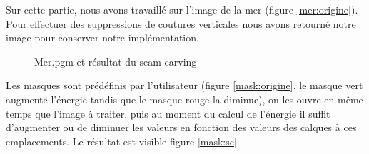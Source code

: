 \documentclass{article}
\begin{document}
Sur cette partie, nous avons travaillé sur l'image de la mer (figure \ref{mer:origine}). Pour effectuer des suppressions de coutures verticales nous avons retourné notre image pour conserver notre implémentation. 

\begin{figure}[!ht]%
  \centering
  \hspace{0.030\textwidth}
  \caption{Mer.pgm et résultat du seam carving}
  \label{mer:init}
\end{figure}

Les masques sont prédéfinis par l'utilisateur (figure \ref{mask:origine}, le masque vert augmente l'énergie tandis que le masque rouge la diminue), on les ouvre en même temps que l'image à
traiter, puis au moment du calcul de l'énergie il suffit d'augmenter ou de diminuer les valeurs
en fonction des valeurs des calques à ces emplacements. Le résultat est visible figure \ref{mask:sc}.
\end{document}
